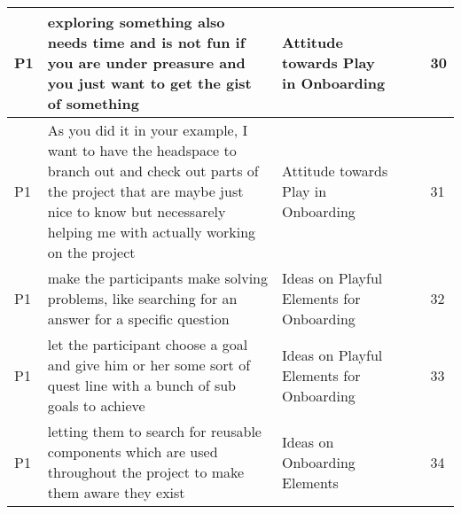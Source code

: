 \begin{appendices}
\begin{landscape}
\begin{longtable}{|p{0.8cm}|p{7cm}|p{3cm}|p{3cm}|p{5.5cm}|p{0.5cm}|}
      P1                   & exploring something also needs time and is not fun if you are under preasure and you just want to get the gist of something                                                                                                                                                 & Attitude towards Play in Onboarding      &                                    &                                                                                                                                                    & 30           \\ \hline
      P1                   & As you did it in your example, I want to have the headspace to branch out and check out parts of the project that are maybe just nice to know but necessarely helping me with actually working on the project                                                               & Attitude towards Play in Onboarding      &                                    &                                                                                                                                                    & 31           \\ \hline
      P1                   & make the participants make solving problems, like searching for an answer for a specific question                                                                                                                                                                           & Ideas on Playful Elements for Onboarding &                                    &                                                                                                                                                    & 32           \\ \hline
      P1                   & let the participant choose a goal and give him or her some sort of quest line with a bunch of sub goals to achieve                                                                                                                                                          & Ideas on Playful Elements for Onboarding &                                    &                                                                                                                                                    & 33           \\ \hline
      P1                   & letting them to search for reusable components which are used throughout the project to make them aware they exist                                                                                                                                                          & Ideas on Onboarding Elements             &                                    &                                                                                                                                                    & 34           \\ \hline

\end{longtable}
\end{landscape}
\end{appendices}

